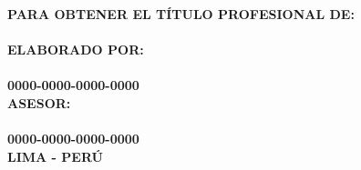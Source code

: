 \begin{titlepage}
\begin{center}
		\vspace{5 mm}	
		{\large \textbf{PARA OBTENER EL TÍTULO PROFESIONAL DE:} }\\
		\vspace{5 mm}	
		{\large \textbf{\@grado} }\\
		\vspace{10 mm}
		{\large \textbf{ELABORADO POR:} }\\
		\vspace{5 mm}	
		{\large \textbf{\@authorcaratula} }\\
		\vspace{5 mm}	
		{\large \textbf{0000-0000-0000-0000} }\\
		\vspace{10 mm}
		{\large \textbf{ASESOR:} }\\
		\vspace{5 mm}	
		{\large \textbf{\@asesor} }\\
		\vspace{5 mm}	
		{\large \textbf{0000-0000-0000-0000} }\\
		\vspace{10 mm}	
		{\large \textbf{LIMA - PERÚ} }\\
		\vspace{5 mm}	
		{\large \textbf{\@yyearr} }\\

	\end{center}

\end{titlepage}